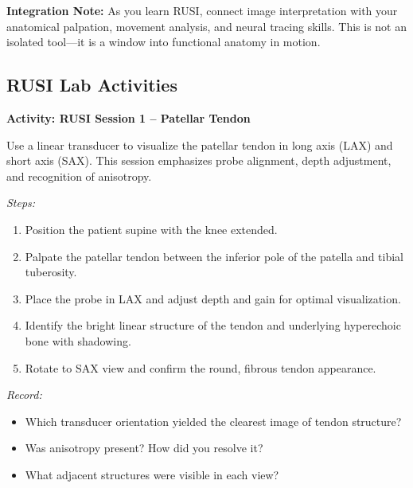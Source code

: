 \textbf{Integration Note:} As you learn RUSI, connect image interpretation with your anatomical palpation, movement analysis, and neural tracing skills. This is not an isolated tool—it is a window into functional anatomy in motion.

\medskip

\subsection*{RUSI Lab Activities}

\begin{labactivitybox}
\textbf{Activity: RUSI Session 1 – Patellar Tendon}

Use a linear transducer to visualize the patellar tendon in long axis (LAX) and short axis (SAX). This session emphasizes probe alignment, depth adjustment, and recognition of anisotropy.

\textit{Steps:}
\begin{enumerate}
  \item Position the patient supine with the knee extended.
  \item Palpate the patellar tendon between the inferior pole of the patella and tibial tuberosity.
  \item Place the probe in LAX and adjust depth and gain for optimal visualization.
  \item Identify the bright linear structure of the tendon and underlying hyperechoic bone with shadowing.
  \item Rotate to SAX view and confirm the round, fibrous tendon appearance.
\end{enumerate}

\textit{Record:}
\begin{itemize}
  \item Which transducer orientation yielded the clearest image of tendon structure?
  \item Was anisotropy present? How did you resolve it?
  \item What adjacent structures were visible in each view?
\end{itemize}
\end{labactivitybox}

\vspace{1em}

